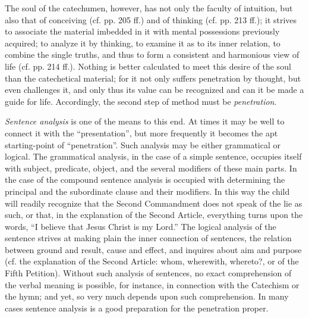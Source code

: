 The soul of the catechumen, however, has not only the faculty of intuition, but also that of conceiving (cf. pp. 205 ff.) and of thinking (cf. pp. 213 ff.); it strives to associate the material imbedded in it with mental possessions previously acquired; to analyze it by thinking, to examine it as to its inner relation, to combine the single truths, and thus to form a consistent and harmonious view of life (cf. pp. 214 ff.). Nothing is better calculated to meet this desire of the soul than the catechetical material; for it not only suffers penetration by thought, but even challenges it, and only thus its value can be recognized and can it be made a guide for life. Accordingly, the second step of method must be \emph{penetration}.

\emph{Sentence analysis} is one of the means to this end. At times it may be well to connect it with the “presentation”, but more frequently it becomes the apt starting-point of “penetration”. Such analysis may be either grammatical or logical. The grammatical analysis, in the case of a simple sentence, occupies itself with subject, predicate, object, and the
several modifiers of these main parts. In the case of the compound sentence analysis is occupied with determining the principal and the subordinate clause and their modifiers. In this way the child will readily recognize that the Second Commandment does not speak of the lie as such, or that, in the explanation of the Second Article, everything turns upon the words, “I believe that Jesus Christ is my Lord.” The logical analysis of the sentence strives at making plain the inner connection of sentences, the relation between ground and result, cause and effect, and inquires about aim and purpose (cf. the explanation of the Second Article: whom, wherewith, whereto?, or of the Fifth Petition). Without such analysis of sentences, no exact comprehension of the verbal meaning is possible, for instance, in connection with the Catechism or the hymn; and yet, so very much depends upon such comprehension. In many cases sentence analysis is a good preparation for the penetration proper.

